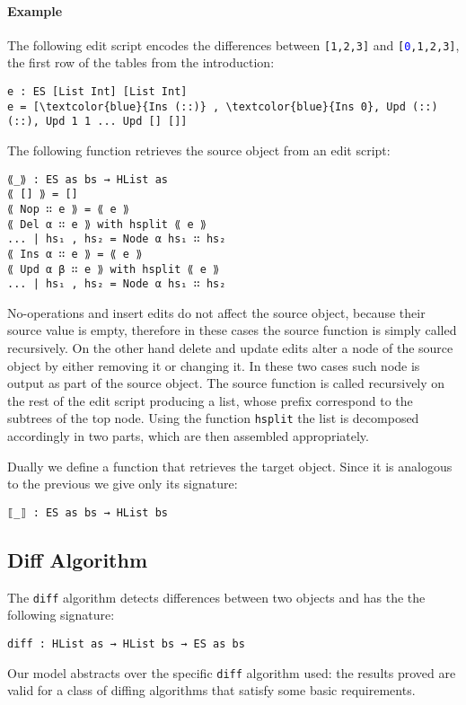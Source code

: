 \documentclass[preprint]{sigplanconf}
\theoremstyle{plain}
\begin{document}
        \paragraph{Example}
        The following edit script encodes the differences between \texttt{[1,2,3]} 
        and \texttt{[\textcolor{blue}{0},1,2,3]}, the first row of the tables 
        from the introduction:

\begin{Verbatim}[commandchars=\\\{\}]
e : ES [List Int] [List Int]
e = [\textcolor{blue}{Ins (::)} , \textcolor{blue}{Ins 0}, Upd (::) (::), Upd 1 1 ... Upd [] []]
\end{Verbatim}

	The following function retrieves the source object from an edit 
        script:			
\begin{verbatim}
⟪_⟫ : ES as bs → HList as
⟪ [] ⟫ = []
⟪ Nop ∷ e ⟫ = ⟪ e ⟫
⟪ Del α ∷ e ⟫ with hsplit ⟪ e ⟫
... | hs₁ , hs₂ = Node α hs₁ ∷ hs₂
⟪ Ins α ∷ e ⟫ = ⟪ e ⟫
⟪ Upd α β ∷ e ⟫ with hsplit ⟪ e ⟫
... | hs₁ , hs₂ = Node α hs₁ ∷ hs₂
\end{verbatim}
	No-operations and insert edits do not affect the source object,
	because their source value is empty, therefore in these cases the source 
	function is simply called recursively.
	On the other hand delete and update edits alter a node of the
	source object by either removing it or changing it.
	In these two cases such node is output as part of the source object.
	The source function is called recursively on the rest of the edit 
	script producing a list, whose prefix correspond to the subtrees of the
	top node. Using the function \texttt{hsplit} the list is decomposed 
	accordingly in two parts, which are then assembled appropriately.
	
	Dually we define a function that retrieves the target object.
	Since it is analogous to the previous we give only its signature:
	
\begin{verbatim}
⟦_⟧ : ES as bs → HList bs
\end{verbatim}

\subsection{Diff Algorithm}
\label{subsec:diff-algo}
The \texttt{diff} algorithm detects differences between
two objects and has the the following signature:
\begin{verbatim}
diff : HList as → HList bs → ES as bs
\end{verbatim}
Our model abstracts over the specific \texttt{diff} algorithm used:
the results proved are valid for a class of diffing algorithms that
satisfy some basic requirements.
\end{document}
